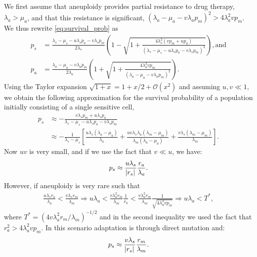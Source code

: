 \documentclass[12pt]{extarticle}
\renewcommand{\Delta}{r}
\begin{document}
\begin{appendices}
We first assume that aneuploidy provides partial resistance to drug therapy, $\lambda_a>\mu_a$, and that this resistance is significant, $\left(\lambda_a-\mu_a-v\lambda_ap_m\right)^2 > 4\lambda_a^2 v p_m$.
We thus rewrite \cref{eq:survival_prob} as
\begin{align*}
p_s&=\frac{\lambda_s-\mu_s-u\lambda_sp_a-v\lambda_sp_m}{2\lambda_s}\left(1-\sqrt{1+\frac{4\lambda_s^2\left(vp_m+up_a\right)}{\left(\lambda_s-\mu_s-u\lambda_sp_a-v\lambda_sp_m\right)^2}}\right) ,
\text{and} \\
p_a&=\frac{\lambda_a-\mu_a-v\lambda_ap_m}{2\lambda_a}\left(1+\sqrt{1+\frac{4\lambda_a^2vp_m}{\left(\lambda_a-\mu_a-v\lambda_ap_m\right)^2}}\right) . 
\end{align*}
Using the Taylor expansion $\sqrt{1+x}=1+x/2+\mathcal{O}(x^2)$ and assuming $u,v \ll 1$,
we obtain the following approximation for the survival probability of a population initially consisting of a single sensitive cell,
\begin{align} \label{eq:survprobwapprox1}
p_s
&\approx -\frac{v\lambda_sp_m+u\lambda_sp_a}{\lambda_s-\mu_s-u\lambda_sp_a-v\lambda_sp_m}\\
\nonumber
&\approx-\frac{1}{\lambda_s-\mu_s}\left[\frac{u\lambda_s\left(\lambda_a-\mu_a\right)}{\lambda_a}+\frac{uv\lambda_s\lambda_a\left(\lambda_m-\mu_m\right)}{\lambda_m\left(\lambda_a-\mu_a\right)}+\frac{v\lambda_s\left(\lambda_m-\mu_m\right)}{\lambda_m}\right].
\end{align}
Now $u v$ is very small, and if we use the fact that $v \ll u$, we have:
\begin{equation}\label{eq:pw_parttolerant}
p_s \approx \frac{u\lambda_s}{\abs{\Delta_s}}  \frac{\Delta_a}{\lambda_a} .
\end{equation}
However, if aneuploidy is very rare such that
\begin{align*}
\frac{u\lambda_s\Delta_a}{\lambda_a}<\frac{v\lambda_s\Delta_m}{\lambda_m}\Rightarrow u\lambda_a<\frac{v\lambda_a^2\Delta_m}{\lambda_m} \frac{1}{\Delta_a}<\frac{v\lambda_a^2\Delta_m}{\lambda_m} \frac{1}{\sqrt{4\lambda_a^2 v p_m}}\Rightarrow u\lambda_a<T^*,
\end{align*}
where $T^* = (4 v \lambda_a^2 \Delta_m/\lambda_m)^{-1/2}$ and in the second inequality we used the fact that $\Delta_a^2 > 4\lambda_a^2 v p_m$. In this scenario adaptation is through direct mutation and:
\begin{equation*}
p_s \approx \frac{v\lambda_s}{\abs{\Delta_s}}  \frac{\Delta_m}{\lambda_m} .
\end{equation*}

\end{appendices}
\end{document}
